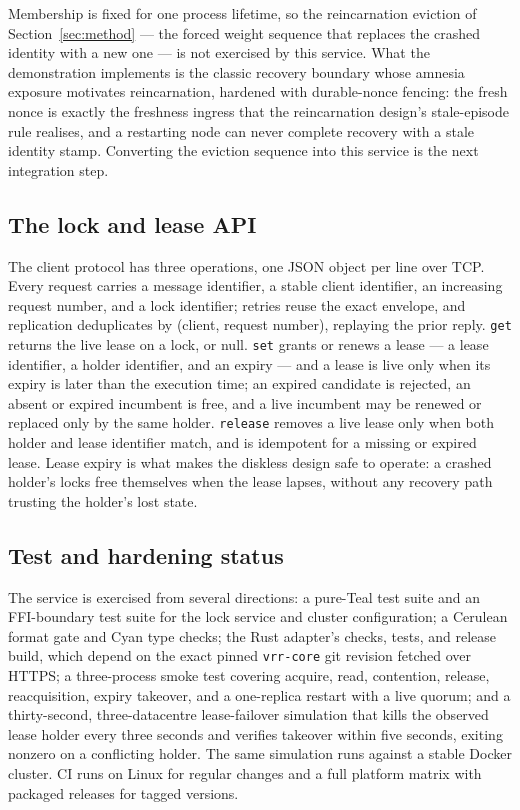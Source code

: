 \documentclass[10pt,journal,letterpaper]{IEEEtran}
\newcommand{\code}[1]{\texttt{#1}}
\begin{document}
Membership is fixed for one process lifetime, so the reincarnation eviction
of Section~\ref{sec:method} --- the forced weight sequence that
replaces the crashed identity with a new one --- is not exercised by this
service. What the demonstration implements is the classic recovery boundary
whose amnesia exposure motivates reincarnation, hardened with durable-nonce
fencing: the fresh nonce is exactly the freshness ingress that the
reincarnation design's stale-episode rule realises, and a restarting node can
never complete recovery with a stale identity stamp. Converting the eviction
sequence into this service is the next integration step.

\subsection{The lock and lease API}
The client protocol has three operations, one JSON object per line over TCP.
Every request carries a message identifier, a stable client identifier, an
increasing request number, and a lock identifier; retries reuse the exact
envelope, and replication deduplicates by (client, request number), replaying
the prior reply.
\code{get} returns the live lease on a lock, or null.
\code{set} grants or renews a lease --- a lease identifier, a holder
identifier, and an expiry --- and a lease is live only when its expiry is
later than the execution time; an expired candidate is rejected, an absent or
expired incumbent is free, and a live incumbent may be renewed or replaced
only by the same holder.
\code{release} removes a live lease only when both holder and lease
identifier match, and is idempotent for a missing or expired lease. Lease
expiry is what makes the diskless design safe to operate: a crashed holder's
locks free themselves when the lease lapses, without any recovery path
trusting the holder's lost state.

\subsection{Test and hardening status}
The service is exercised from several directions: a pure-Teal test suite and
an FFI-boundary test suite for the lock service and cluster configuration; a
Cerulean format gate and Cyan type checks; the Rust adapter's checks, tests,
and release build, which depend on the exact pinned \code{vrr-core} git
revision fetched over HTTPS; a three-process smoke test covering acquire,
read, contention, release, reacquisition, expiry takeover, and a one-replica
restart with a live quorum; and a thirty-second, three-datacentre
lease-failover simulation that kills the observed lease holder every three
seconds and verifies takeover within five seconds, exiting nonzero on a
conflicting holder. The same simulation runs against a stable Docker
cluster. CI runs on Linux for regular changes and a full platform matrix
with packaged releases for tagged versions.
\end{document}
